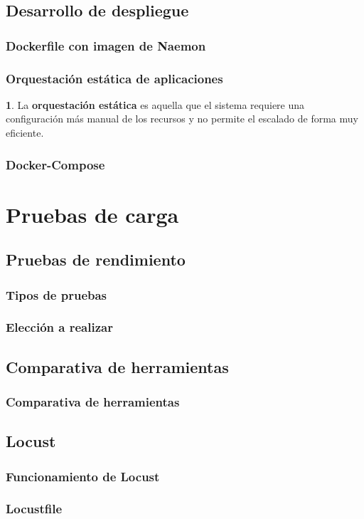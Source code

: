 \documentclass{beamer}
\theoremstyle{plain}
\theoremstyle{definition}
\newtheorem{defn}[thm]{}
\theoremstyle{plain}
\theoremstyle{definition}
\theoremstyle{remark}
\theoremstyle{definition}
\begin{document}
\subsection{Desarrollo de despliegue}
\begin{frame}
	\frametitle{Dockerfile con imagen de Naemon}
	
\end{frame}
\begin{frame}
	\frametitle{Orquestación estática de aplicaciones}
	\begin{defn}
		La \textbf{orquestación estática} es aquella que el sistema requiere una configuración más
		manual de los recursos y no permite el escalado de forma muy eficiente.
	\end{defn}
\end{frame}
\begin{frame}
	\frametitle{Docker-Compose}
\end{frame}
\section{Pruebas de carga} %


\subsection{Pruebas de rendimiento}
\begin{frame}
	\frametitle{Tipos de pruebas}
	
\end{frame}
\begin{frame}
	\frametitle{Elección a realizar}
	
\end{frame}

\subsection{Comparativa de herramientas}
\begin{frame}
	\frametitle{Comparativa de herramientas}
	
\end{frame}

\subsection{Locust}
\begin{frame}
	\frametitle{Funcionamiento de Locust}
	
\end{frame}
\begin{frame}
	\frametitle{Locustfile}
\end{frame}
\end{document}
